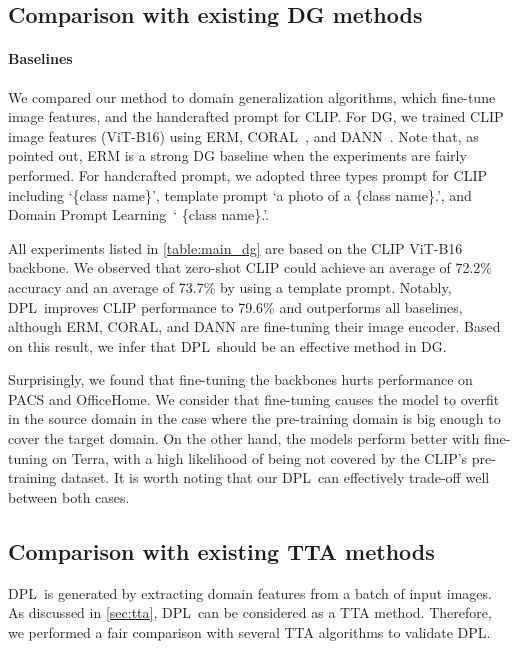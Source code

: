 \documentclass[letterpaper]{article} \usepackage[]{aaai23}
\newcommand{\dplshort}{DPL}
\newcommand{\dpllong}{Domain Prompt Learning}
\begin{document}
\subsection{Comparison with existing DG methods}
\label{subsec:dg}

\paragraph{Baselines}
We compared our method to domain generalization algorithms, which fine-tune image features, and the handcrafted prompt for CLIP.
For DG, we trained CLIP image features (ViT-B16) using ERM, CORAL~\cite{sun2016deep}, and DANN~\cite{ganin2016domain}. 
Note that, as~\cite{gulrajani2020search} pointed out, ERM is a strong DG baseline when the experiments are fairly performed. 
For handcrafted prompt, we adopted three types prompt for CLIP including `\{class name\}', template prompt `a photo of a \{class name\}.', and \dpllong~` \{class name\}.'.

All experiments listed in \autoref{table:main_dg} are based on the CLIP ViT-B16 backbone.
We observed that zero-shot CLIP could achieve an average of 72.2\% accuracy and an average of 73.7\% by using a template prompt.
Notably, \dplshort~improves CLIP performance to 79.6\% and outperforms all baselines, although ERM, CORAL, and DANN are fine-tuning their image encoder.
Based on this result, we infer that \dplshort~should be an effective method in DG.

Surprisingly, we found that fine-tuning the backbones hurts performance on PACS and OfficeHome.
We consider that fine-tuning causes the model to overfit in the source domain in the case where the pre-training domain is big enough to cover the target domain.
On the other hand, the models perform better with fine-tuning on Terra, with a high likelihood of being not covered by the CLIP's pre-training dataset.
It is worth noting that our \dplshort~can effectively trade-off well between both cases.

\subsection{Comparison with existing TTA methods}

\dplshort~is generated by extracting domain features from a batch of input images.
As discussed in \autoref{sec:tta}, \dplshort~can be considered as a TTA method.
Therefore, we performed a fair comparison with several TTA algorithms to validate \dplshort.
\end{document}
